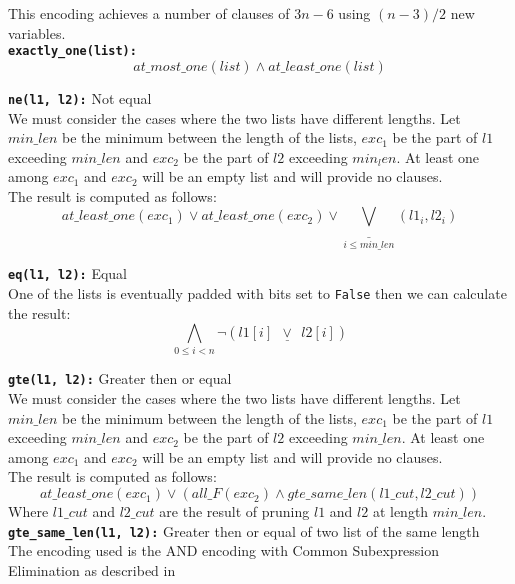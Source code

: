 This encoding achieves a number of clauses of $3n - 6$ using $(n-3)/2$ new variables.
\\

\texttt{\textbf{exactly\_one(list):}}
\begin{equation}
    at\_most\_one(list) \wedge at\_least\_one(list)
\end{equation}


\texttt{\textbf{ne(l1, l2):}} Not equal\\
We must consider the cases where the two lists have different lengths.
Let $min\_len$ be the minimum between the length of the lists, $exc_1$ be the part of $l1$
 exceeding $min\_len$ and $exc_2$ be the part of $l2$ exceeding $min_len$. At least one 
among $exc_1$ and $exc_2$ will be an empty list and will provide no clauses.\\
The result is computed as follows:
\begin{equation}
    at\_least\_one(exc_1) \vee at\_least\_one(exc_2) \vee \underline{\bigvee}\limits_{i \leq min\_len}(l1_i, l2_i)
\end{equation}

\texttt{\textbf{eq(l1, l2):}} Equal\\
One of the lists is eventually padded with bits set to \texttt{False} then we can
calculate the result:
\begin{equation}
    \bigwedge\limits_{0 \leq i < n} \neg (l1[i]      \ \ \underline\vee\ \ l2[i] )
\end{equation}


\texttt{\textbf{gte(l1, l2):}} Greater then or equal\\
We must consider the cases where the two lists have different lengths.
Let $min\_len$ be the minimum between the length of the lists, $exc_1$ be the part of $l1$ 
exceeding $min\_len$ and $exc_2$ be the part of $l2$ exceeding $min\_len$. At least one among
$exc_1$ and $exc_2$ will be an empty list and will provide no clauses.\\
The result is computed as follows:
\begin{equation}
    at\_least\_one(exc_1) \vee ( all\_F(exc_2) \wedge gte\_same\_len(l1\_cut, l2\_cut))
\end{equation}
Where $l1\_cut$ and $l2\_cut$ are the result of pruning $l1$ and $l2$ at length $min\_len$.\\

\texttt{\textbf{gte\_same\_len(l1, l2):}} Greater then or equal of two list of the same length\\
The encoding used is the AND encoding with Common Subexpression Elimination as described in 

